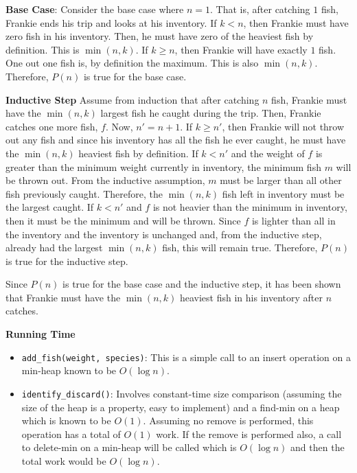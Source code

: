 \documentclass[12pt,twoside]{article}
\begin{document}
\begin{problems}
\begin{problemparts}
    {\bf Base Case}: Consider the base case where $ n = 1 $. That is, after
    catching $ 1 $ fish, Frankie ends his trip and looks at his inventory. If
    $ k < n $, then Frankie must have zero fish in his inventory. Then, he
    must have zero of the heaviest fish by definition. This is $ \min(n, k)
    $. If $ k \geq n $, then Frankie will have exactly $ 1 $ fish. One out
    one fish is, by definition the maximum. This is also $ \min(n, k) $.
    Therefore, $ P(n) $ is true for the base case.

    {\bf Inductive Step} Assume from induction that after catching $ n $
    fish, Frankie must have the $ \min(n, k) $ largest fish he caught during
    the trip. Then, Frankie catches one more fish, $ f $. Now, $ n' = n + 1
    $. If $ k \geq n' $, then Frankie will not throw out any fish and since his
    inventory has all the fish he ever caught, he must have the $ \min(n, k)
    $ heaviest fish by definition. If $ k < n' $ and the weight of $ f $ is
    greater than the minimum weight currently in inventory, the minimum fish
    $ m $ will be thrown out. From the inductive assumption, $ m $ must be
    larger than all other fish previously caught. Therefore, the $ \min(n, k)
    $ fish left in inventory must be the largest caught. If $ k < n' $ and $
    f $ is not heavier than the minimum in inventory, then it must be the
    minimum and will be thrown. Since $ f $ is lighter than all in the
    inventory and the inventory is unchanged and, from the inductive step,
    already had the largest $ \min(n, k) $ fish, this will remain true.
    Therefore, $ P(n) $ is true for the inductive step.

    Since $ P(n) $ is true for the base case and the inductive step, it has
    been shown that Frankie must have the $ \min(n, k) $ heaviest fish in his
    inventory after $ n $ catches.

    \smallbreak

    {\bf Running Time}
    \begin{itemize}
        \item {\tt add\_fish(weight, species)}: This is a simple call to an
        insert operation on a min-heap known to be $ O(\log n) $.
        \item {\tt identify\_discard()}: Involves constant-time size
        comparison (assuming the size of the heap is a property, easy to
        implement) and a find-min on a heap which is known to be $ O(1) $.
        Assuming no remove is performed, this operation has a total of $ O(1)
        $ work. If the remove is performed also, a call to delete-min on a
        min-heap will be called which is $ O(\log n ) $ and then the total
        work would be $ O(\log n)$.
    \end{itemize}


\end{problemparts}
\end{problems}
\end{document}
